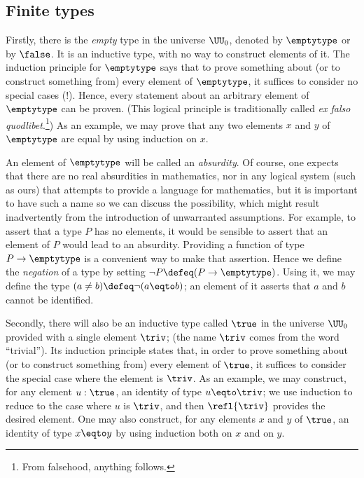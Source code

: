 \subsection{Finite types}
\label{sec:finite-types}
Firstly, there is the \emph{empty} type in the universe $\UU_0$, denoted by $\emptytype$ or by $\false$.  It is an inductive type, with no way
to construct elements of it.  The induction principle for $\emptytype$ says that to prove something about (or to construct something from) every
element of $\emptytype$, it suffices to consider no special cases (!).  Hence, every statement about an arbitrary element of $\emptytype$ can be
proven. (This logical principle is traditionally called \emph{ex falso quodlibet}.\footnote{%
From falsehood, anything follows.}) As an example, we may prove that any two elements $x$ and $y$ of $\emptytype$ are equal by using induction
on $x$.

An element of $\emptytype$ will be called an \emph{absurdity}.  Of course, one expects that there are no real absurdities in mathematics, nor in any
logical system (such as ours) that attempts to provide a language for mathematics, but it is important to have such a name so we can discuss
the possibility, which might result inadvertently from the introduction of unwarranted assumptions.  For example, to assert that a type $P$ has
no elements, it would be sensible to assert that an element of $P$ would lead to an absurdity.  Providing a function of type $P \to \emptytype$ is a
convenient way to make that assertion.  Hence we define the \emph{negation} of a type by setting $\neg P \defeq (P \to \emptytype)$.  Using it, we
may define the type $(a \ne b) \defeq \neg (a \eqto b)$; an element of it asserts that $a$ and $b$ cannot be identified.

Secondly, there will also be an inductive type called $\true$ in the universe $\UU_0$ provided with a single element $\triv$; (the name $\triv$
comes from the word ``trivial'').  Its induction principle states that, in order to prove something about (or to construct something from) every
element of $\true$, it suffices to consider the special case where the element is $\triv$.  As an example, we may construct, for any element 
$u : \true$, an identity of type $u \eqto \triv$; we use induction to reduce to the case where $u$ is $\triv$, and then $\refl{\triv}$ provides the
desired element.  One may also construct, for any elements $x$ and $y$ of $\true$, an identity of type $x \eqto y$ by using induction both on $x$ and
on $y$.

